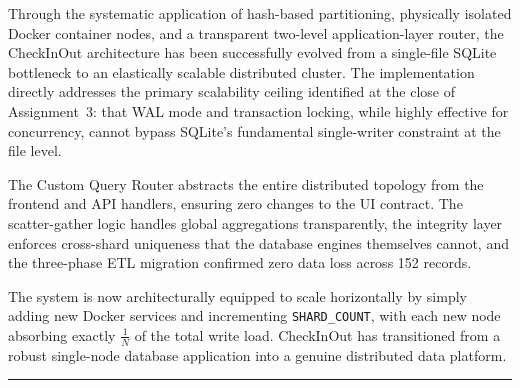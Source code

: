 \documentclass[sigconf]{acmart}
\begin{document}
Through the systematic application of hash-based partitioning, physically isolated Docker container nodes, and a transparent two-level application-layer router, the CheckInOut architecture has been successfully evolved from a single-file SQLite bottleneck to an elastically scalable distributed cluster. The implementation directly addresses the primary scalability ceiling identified at the close of Assignment~3: that WAL mode and transaction locking, while highly effective for concurrency, cannot bypass SQLite's fundamental single-writer constraint at the file level.

The Custom Query Router abstracts the entire distributed topology from the frontend and API handlers, ensuring zero changes to the UI contract. The scatter-gather logic handles global aggregations transparently, the integrity layer enforces cross-shard uniqueness that the database engines themselves cannot, and the three-phase ETL migration confirmed zero data loss across 152 records.

The system is now architecturally equipped to scale horizontally by simply adding new Docker services and incrementing \texttt{SHARD\_COUNT}, with each new node absorbing exactly $\frac{1}{N}$ of the total write load. CheckInOut has transitioned from a robust single-node database application into a genuine distributed data platform.

\noindent\rule{\columnwidth}{0.5pt}
\end{document}
